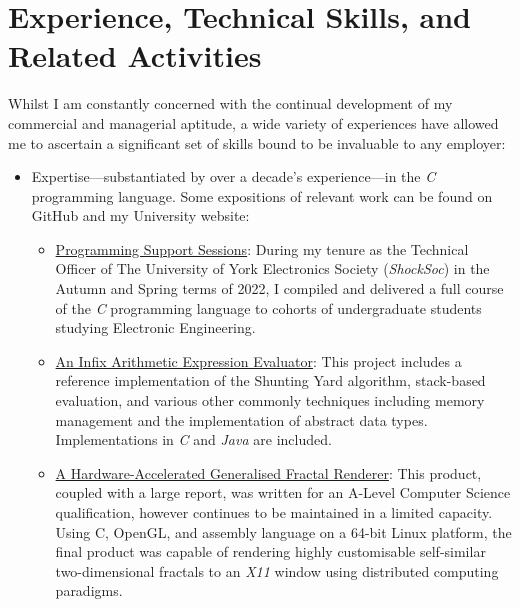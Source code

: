 \documentclass{article}
\newcommand{\githublink}[2]{\href{https://github.com/oliverdixon/#1}{#2}}
\newcommand{\weblink}[2]{\href{https://www-users.york.ac.uk/~od641/#1}{#2}}
\begin{document}
\section{Experience, Technical Skills, and Related Activities}
Whilst I am constantly concerned with the continual development of my commercial
and managerial aptitude, a wide variety of experiences have allowed me to
ascertain a significant set of skills bound to be invaluable to any employer:
\begin{itemize}
        \item Expertise---substantiated by over a decade's experience---in the
        \textit{C} programming language. Some expositions of relevant work
        can be found on GitHub and my University website:
        \begin{itemize}
                \item \weblink{pss}{Programming Support Sessions}: During my
                tenure as the Technical Officer of The University of York
                Electronics Society (\textit{ShockSoc}) in the Autumn and Spring
                terms of 2022, I compiled and delivered a full course of the
                \textit{C} programming language to cohorts of undergraduate
                students studying Electronic Engineering.

                \item \githublink{calculator-demo}{An Infix Arithmetic
                Expression Evaluator}: This project includes a reference
                implementation of the Shunting Yard algorithm, stack-based
                evaluation, and various other commonly techniques including
                memory management and the implementation of abstract data types.
                Implementations in \textit{C} and \textit{Java} are included.

                \item \weblink{fractal}{A Hardware-Accelerated Generalised
                Fractal Renderer}: This product, coupled with a large report,
                was written for an A-Level Computer Science qualification,
                however continues to be maintained in a limited capacity. Using
                C, OpenGL, and assembly language on a 64-bit Linux platform, the
                final product was capable of rendering highly customisable
                self-similar two-dimensional fractals to an \textit{X11} window
                using distributed computing paradigms.


\end{itemize}
\end{itemize}
\end{document}
